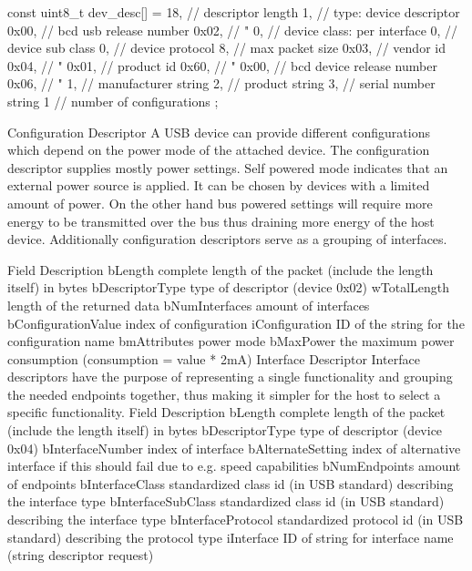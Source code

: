 \begin{verbatim*}
 const uint8_t dev_desc[] = {
	18,     // descriptor length
	1,      // type: device descriptor
	0x00,   // bcd usb release number
	0x02,   //  "
	0,      // device class: per interface
	0,      // device sub class
	0,      // device protocol
	8,     // max packet size
	0x03,   // vendor id
	0x04,   //  "
	0x01,   // product id
	0x60,   //  "
	0x00,   // bcd device release number
	0x06,   //  "
	1,      // manufacturer string
	2,      // product string
	3,      // serial number string
	1       // number of configurations
};
\end{verbatim*}
Configuration Descriptor
A USB device can provide different configurations which depend on the power mode of the attached device. The configuration descriptor supplies mostly power settings. Self powered mode indicates that an external power source is applied. It can be chosen by devices with a limited amount of power. On the other hand bus powered settings will require more energy to be transmitted over the bus thus draining more energy of the host device. Additionally configuration descriptors serve as a grouping of interfaces.

Field
Description
bLength
complete length of the packet (include the length itself) in bytes
bDescriptorType
type of descriptor (device 0x02)
wTotalLength
length of the returned data
bNumInterfaces
amount of interfaces
bConfigurationValue
index of configuration
iConfiguration
ID of the string for the configuration name
bmAttributes
power mode
bMaxPower
the maximum power consumption (consumption = value * 2mA)
Interface Descriptor
Interface descriptors have the purpose of representing a single functionality and grouping the needed endpoints together, thus making it simpler for the host to select a specific functionality.
Field
Description
bLength
complete length of the packet (include the length itself) in bytes
bDescriptorType
type of descriptor (device 0x04)
bInterfaceNumber
index of interface
bAlternateSetting
index of alternative interface if this should fail due to e.g. speed capabilities
bNumEndpoints
amount of endpoints
bInterfaceClass
standardized class id (in USB standard) describing the interface type
bInterfaceSubClass
standardized class id (in USB standard) describing the interface type
bInterfaceProtocol
standardized protocol id (in USB standard) describing the protocol type
iInterface
ID of string for interface name (string descriptor request)

